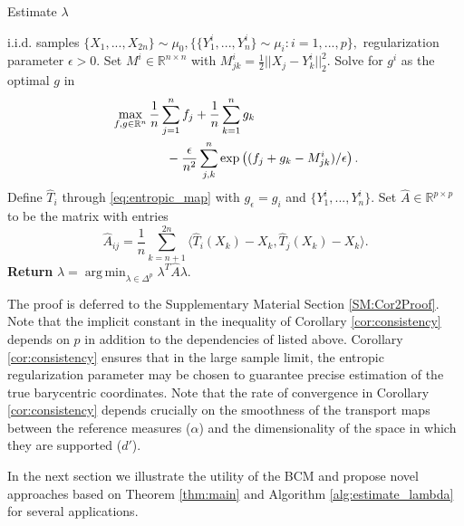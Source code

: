 \documentclass[nohyperref]{article}
\DeclareMathOperator*{\argmin}{arg\,min}
\theoremstyle{definition}
\begin{document}
\begin{algorithm}[ht!]
\caption{\label{alg1}Estimate $\lambda$} \label{alg:estimate_lambda}
\begin{algorithmic}
 i.i.d. samples $\{X_1,...,X_{2n}\} \sim \mu_0, \{\{Y_1^i,...,Y_n^i\} \sim \mu_i: i=1,...,p\},$ regularization parameter $\epsilon > 0$.
    \STATE Set $M^i \in \mathbb{R}^{n\times n}$ with $M^i_{jk} = \frac{1}{2}||X_j - Y_k^i||_2^2$.
    \STATE Solve for $g^i$ as the optimal $g$ in
    \begin{equation*} \begin{split}
        &\max_{f,g \in \mathbb{R}^n} \frac{1}{n}\sum_{j=1}^n f_j+ \frac{1}{n}\sum_{k=1}^n g_k \\ 
        &\hspace{1.5cm}- \frac{\epsilon}{n^2}\sum_{j,k}^n \exp \left((f_j + g_k - M_{jk}^i)/\epsilon \right).
    \end{split}
    \end{equation*}
    \STATE Define $\hat{T}_i$ through \ref{eq:entropic_map} with $g_\epsilon = g_i$ and $\{Y_1^i,...,Y_n^i\}$. 
\ENDFOR
\STATE Set $\hat{A} \in \mathbb{R}^{p \times p}$ to be the matrix with entries
\begin{equation*}
    \hat{A}_{ij} = \frac{1}{n}\sum_{k=n+1}^{2n} \langle \hat{T}_i(X_k) - X_k, \hat{T}_j(X_k) - X_k \rangle.
\end{equation*}
\STATE \textbf{Return} $\hat{\lambda}=\displaystyle\argmin_{\lambda \in \Delta^p} \lambda^T\hat{A}\lambda$.
\end{algorithmic}
\end{algorithm}

The proof is deferred to the Supplementary Material Section \ref{SM:Cor2Proof}.  Note that the implicit constant in the inequality of Corollary \ref{cor:consistency} depends on $p$ in addition to the dependencies of listed above.  Corollary \ref{cor:consistency} ensures that in the large sample limit, the entropic regularization parameter may be chosen to guarantee precise estimation of the true barycentric coordinates.  Note that the rate of convergence in Corollary \ref{cor:consistency} depends crucially on the smoothness of the transport maps between the reference measures ($\alpha$) and the dimensionality of the space in which they are supported ($d'$).

In the next section we illustrate the utility of the BCM  and propose novel approaches based on Theorem \ref{thm:main} and Algorithm \ref{alg:estimate_lambda} for several applications. 
\end{document}
